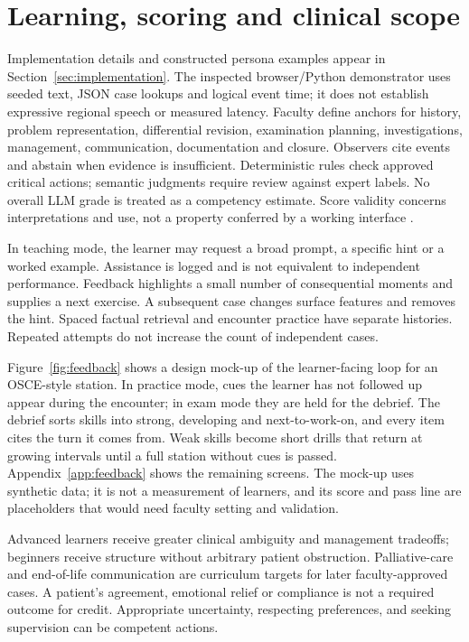 \documentclass[pmlr,twocolumn,10pt]{jmlr}
\begin{document}
\section{Learning, scoring and clinical scope}
Implementation details and constructed persona examples appear in Section~\ref{sec:implementation}. The inspected browser/Python demonstrator uses seeded text, JSON case lookups and logical event time; it does not establish expressive regional speech or measured latency.
Faculty define anchors for history, problem representation, differential revision, examination planning, investigations, management, communication, documentation and closure. Observers cite events and abstain when evidence is insufficient. Deterministic rules check approved critical actions; semantic judgments require review against expert labels. No overall LLM grade is treated as a competency estimate. Score validity concerns interpretations and use, not a property conferred by a working interface \citep{cook2006}.

In teaching mode, the learner may request a broad prompt, a specific hint or a worked example. Assistance is logged and is not equivalent to independent performance. Feedback highlights a small number of consequential moments and supplies a next exercise. A subsequent case changes surface features and removes the hint. Spaced factual retrieval and encounter practice have separate histories. Repeated attempts do not increase the count of independent cases.

Figure~\ref{fig:feedback} shows a design mock-up of the learner-facing loop for an OSCE-style station. In practice mode, cues the learner has not followed up appear during the encounter; in exam mode they are held for the debrief. The debrief sorts skills into strong, developing and next-to-work-on, and every item cites the turn it comes from. Weak skills become short drills that return at growing intervals until a full station without cues is passed. Appendix~\ref{app:feedback} shows the remaining screens. The mock-up uses synthetic data; it is not a measurement of learners, and its score and pass line are placeholders that would need faculty setting and validation.

Advanced learners receive greater clinical ambiguity and management tradeoffs; beginners receive structure without arbitrary patient obstruction. Palliative-care and end-of-life communication are curriculum targets for later faculty-approved cases. A patient's agreement, emotional relief or compliance is not a required outcome for credit. Appropriate uncertainty, respecting preferences, and seeking supervision can be competent actions.
\end{document}
